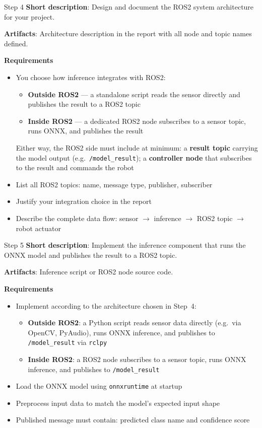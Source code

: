 \documentclass[aspectratio=169]{beamer}
\begin{document}
\begin{frame}[t]{Step 4}
\vspace{-0.4cm}
\textbf{Short description}: Design and document the ROS2 system architecture for your project.

\textbf{Artifacts}: Architecture description in the report with all node and topic names defined.

\textbf{Requirements}
\footnotesize
\begin{itemize}
    \item You choose how inference integrates with ROS2:
    \begin{itemize}\footnotesize
        \item \textbf{Outside ROS2} --- a standalone script reads the sensor directly and publishes the result to a ROS2 topic
        \item \textbf{Inside ROS2} --- a dedicated ROS2 node subscribes to a sensor topic, runs ONNX, and publishes the result
    \end{itemize}
Either way, the ROS2 side must include at minimum: a \textbf{result topic} carrying the model output (e.g.\ \texttt{/model\_result}); a \textbf{controller node} that subscribes to the result and commands the robot
    \item List all ROS2 topics: name, message type, publisher, subscriber
    \item Justify your integration choice in the report
    \item Describe the complete data flow: sensor $\to$ inference $\to$ ROS2 topic $\to$ robot actuator
\end{itemize}
\end{frame}

\begin{frame}[t]{Step 5}
\vspace{-0.3cm}
\textbf{Short description}: Implement the inference component that runs the ONNX model and publishes the result to a ROS2 topic.

\textbf{Artifacts}: Inference script or ROS2 node source code.

\textbf{Requirements}
\footnotesize
\begin{itemize}
    \item Implement according to the architecture chosen in Step~4:
    \begin{itemize}\footnotesize
        \item \textbf{Outside ROS2}: a Python script reads sensor data directly (e.g.\ via OpenCV, PyAudio), runs ONNX inference, and publishes to \texttt{/model\_result} via \texttt{rclpy}
        \item \textbf{Inside ROS2}: a ROS2 node subscribes to a sensor topic, runs ONNX inference, and publishes to \texttt{/model\_result}
    \end{itemize}
    \item Load the ONNX model using \texttt{onnxruntime} at startup
    \item Preprocess input data to match the model's expected input shape
    \item Published message must contain: predicted class name and confidence score
\end{itemize}
\end{frame}
\end{document}
